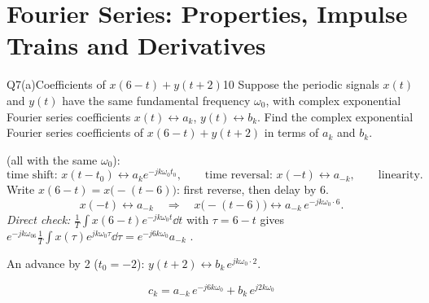 \renewcommand{\teacherTag}{QUESTION 7 \textbullet\ 35 MARKS}
\chapter{Fourier Series: Properties, Impulse Trains and Derivatives}

\begin{qcard}{Q7(a)}{Coefficients of $x(6-t)+y(t+2)$}{10}
Suppose the periodic signals $x(t)$ and $y(t)$ have the same fundamental frequency $\omega_0$, with complex exponential Fourier series coefficients $x(t)\leftrightarrow a_k$, $y(t)\leftrightarrow b_k$. Find the complex exponential Fourier series coefficients of $x(6-t)+y(t+2)$ in terms of $a_k$ and $b_k$.
\end{qcard}
\begin{solution}
 (all with the same $\omega_0$):
\[\text{time shift: }x(t-t_0)\leftrightarrow a_ke^{-jk\omega_0t_0},\qquad\text{time reversal: }x(-t)\leftrightarrow a_{-k},\qquad\text{linearity}.\]
 Write $x(6-t)=x\big(-(t-6)\big)$: first reverse, then delay by 6.
\[x(-t)\leftrightarrow a_{-k}\quad\Longrightarrow\quad x\big(-(t-6)\big)\leftrightarrow a_{-k}\,e^{-jk\omega_0\cdot6}.\]
\emph{Direct check:} $\frac1T\int x(6-t)e^{-jk\omega_0t}\dd t$ with $\tau=6-t$ gives $e^{-jk\omega_06}\frac1T\int x(\tau)e^{jk\omega_0\tau}\dd\tau=e^{-j6k\omega_0}a_{-k}$ \checkmark.

 An advance by 2 ($t_0=-2$): $y(t+2)\leftrightarrow b_k\,e^{jk\omega_0\cdot2}$.

\[\boxed{c_k=a_{-k}\,e^{-j6k\omega_0}+b_k\,e^{j2k\omega_0}}\]
\end{solution}

